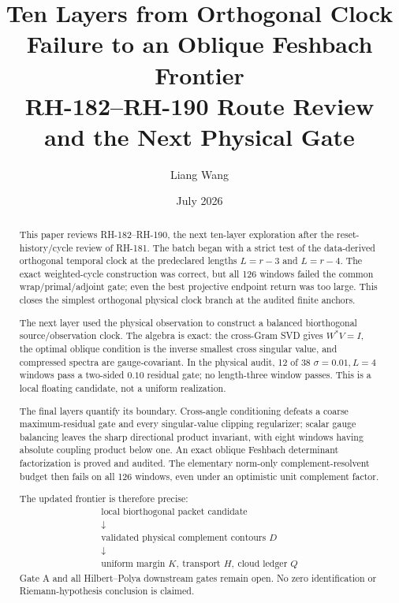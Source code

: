 \documentclass[12pt]{article}
\title{Ten Layers from Orthogonal Clock Failure to an Oblique Feshbach Frontier\\
\large RH-182--RH-190 Route Review and the Next Physical Gate}
\author{Liang Wang}
\date{July 2026}
\theoremstyle{remark}
\begin{document}
\maketitle

\begin{abstract}
This paper reviews RH-182--RH-190, the next ten-layer exploration after the
reset-history/cycle review of RH-181.  The batch began with a strict test of
the data-derived orthogonal temporal clock at the predeclared lengths
$L=r-3$ and $L=r-4$.  The exact weighted-cycle construction was correct, but
all 126 windows failed the common wrap/primal/adjoint gate; even the best
projective endpoint return was too large.  This closes the simplest
orthogonal physical clock branch at the audited finite anchors.

The next layer used the physical observation to construct a balanced
biorthogonal source/observation clock.  The algebra is exact: the cross-Gram
SVD gives $W^*V=I$, the optimal oblique condition is the inverse smallest
cross singular value, and compressed spectra are gauge-covariant.  In the
physical audit, 12 of 38 $\sigma=0.01,L=4$ windows pass a two-sided $0.10$
residual gate; no length-three window passes.  This is a local floating
candidate, not a uniform realization.

The final layers quantify its boundary.  Cross-angle conditioning defeats a
coarse maximum-residual gate and every singular-value clipping regularizer;
scalar gauge balancing leaves the sharp directional product invariant, with
eight windows having absolute coupling product below one.  An exact oblique
Feshbach determinant factorization is proved and audited.  The elementary
norm-only complement-resolvent budget then fails on all 126 windows, even
under an optimistic unit complement factor.

The updated frontier is therefore precise:
\begin{equation*}
 \begin{gathered}
 \text{local biorthogonal packet candidate}\\
 \downarrow\\
 \text{validated physical complement contours }D\\
 \downarrow\\
 \text{uniform margin }K,\ \text{transport }H,\ \text{cloud ledger }Q
 \end{gathered}
\end{equation*}
Gate A and all Hilbert--Polya downstream gates remain open.  No zero
identification or Riemann-hypothesis conclusion is claimed.
\end{abstract}
\end{document}
